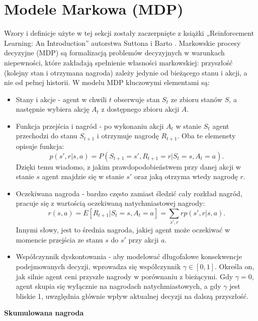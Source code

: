 \documentclass[a4paper, 12pt]{article}
\numberwithin{equation}{section}
\begin{document}
    \section{Modele Markowa (MDP)}
    Wzory i definicje użyte w tej sekcji zostały zaczerpnięte z książki „Reinforcement Learning: An Introduction” autorstwa Suttona i Barto \cite{sutton2018rl}.
    Markowskie procesy decyzyjne (MDP) są formalizacją problemów decyzyjnych w warunkach niepewności, które zakładają spełnienie własności markowskiej: przyszłość (kolejny stan i otrzymana nagroda) zależy jedynie od bieżącego stanu i akcji, a nie od pełnej historii.
    W modelu MDP kluczowymi elementami są:
    \begin{itemize}
        \item Stany i akcje - agent w chwili \( t \) obserwuje stan \( S_t \) ze zbioru stanów \( S \), a następnie wybiera akcję \( A_t \) z dostępnego zbioru akcji \( A \).
        \item Funkcja przejścia i nagród - po wykonaniu akcji \( A_t \) w stanie \( S_t \) agent przechodzi do stanu \( S_{t+1} \) i otrzymuje nagrodę \( R_{t+1} \). Oba te elemenety opisuje funkcja:
        \begin{equation}
        p(s',r|s,a) = P(S_{t+1} = s', R_{t+1} = r | S_t = s, A_t = a).
        \end{equation}
        Dzięki temu wiadomo, z jakim prawdopodobieństwem przy danej akcji w stanie \( s \) agent znajdzie się w stanie \( s' \) oraz jaką otrzyma wtedy nagrodę \( r \).
        \item Oczekiwana nagroda - bardzo często zamiast śledzić cały rozkład nagród, pracuje się z wartością oczekiwaną natychmiastowej nagrody:
        \begin{equation}
        r(s,a) = E[R_{t+1} | S_t = s, A_t = a] = \sum_{s',r} r p(s',r|s,a).
        \end{equation}
        Innymi słowy, jest to średnia nagroda, jakiej agent może oczekiwać w momencie przejścia ze stanu \( s \) do \( s' \) przy akcji \( a \).
        \item Współczynnik dyskontowania - aby modelować długofalowe konsekwencje podejmowanych decyzji, wprowadza się współczynnik \( \gamma \in [0,1] \). Określa on, jak silnie agent ceni przyszłe nagrody w porównaniu z bieżącymi. Gdy \( \gamma = 0 \), agent skupia się wyłącznie na nagrodach natychmiastowych, a gdy \( \gamma \) jest bliskie 1, uwzględnia głównie wpływ aktualnej decyzji na dalszą przyszłość.
    \end{itemize}
    \textbf{Skumulowana nagroda} \\ \\ 
\end{document}
